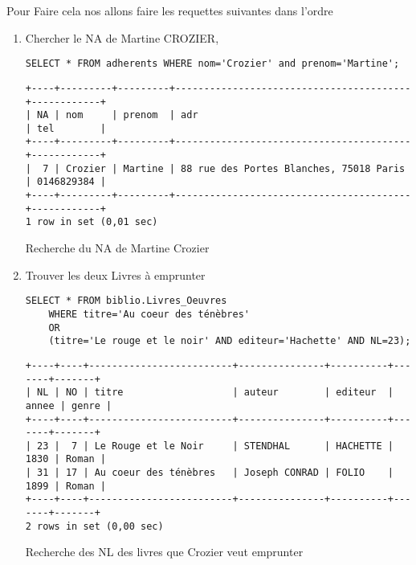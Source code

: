 \documentclass{article}
\begin{document}
Pour Faire cela nos allons faire les requettes suivantes dans l'ordre
\begin{enumerate}

	\item  Chercher le NA de Martine CROZIER,
	      \begin{listing}[H]
		      \begin{verbatim}
SELECT * FROM adherents WHERE nom='Crozier' and prenom='Martine';
\end{verbatim}
		      \begin{verbatim}
+----+---------+---------+-----------------------------------------+------------+
| NA | nom     | prenom  | adr                                     | tel        |
+----+---------+---------+-----------------------------------------+------------+
|  7 | Crozier | Martine | 88 rue des Portes Blanches, 75018 Paris | 0146829384 |
+----+---------+---------+-----------------------------------------+------------+
1 row in set (0,01 sec)
\end{verbatim}
		      \caption{Recherche du NA de Martine Crozier}
	      \end{listing}

	\item Trouver les deux Livres à emprunter
	      \begin{listing}[H]
		      \begin{verbatim}
SELECT * FROM biblio.Livres_Oeuvres
	WHERE titre='Au coeur des ténèbres' 
	OR 
	(titre='Le rouge et le noir' AND editeur='Hachette' AND NL=23);
\end{verbatim}
		      \begin{verbatim}
+----+----+-------------------------+---------------+----------+-------+-------+
| NL | NO | titre                   | auteur        | editeur  | annee | genre |
+----+----+-------------------------+---------------+----------+-------+-------+
| 23 |  7 | Le Rouge et le Noir     | STENDHAL      | HACHETTE |  1830 | Roman |
| 31 | 17 | Au coeur des ténèbres   | Joseph CONRAD | FOLIO    |  1899 | Roman |
+----+----+-------------------------+---------------+----------+-------+-------+
2 rows in set (0,00 sec)
\end{verbatim}
		      \caption{Recherche des NL des livres que Crozier veut emprunter}
	      \end{listing}


\end{enumerate}
\end{document}
